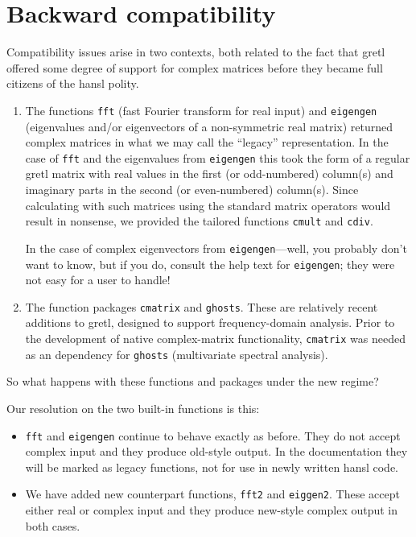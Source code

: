\documentclass{article}
\begin{document}
\section{Backward compatibility}
\label{sec:compat}

Compatibility issues arise in two contexts, both related to the fact
that gretl offered some degree of support for complex matrices before
they became full citizens of the hansl polity.

\begin{enumerate}
\item The functions \texttt{fft} (fast Fourier transform for real
  input) and \texttt{eigengen} (eigenvalues and/or eigenvectors of a
  non-symmetric real matrix) returned complex matrices in what we may
  call the ``legacy'' representation. In the case of \texttt{fft} and
  the eigenvalues from \texttt{eigengen} this took the form of a
  regular gretl matrix with real values in the first (or odd-numbered)
  column(s) and imaginary parts in the second (or even-numbered)
  column(s). Since calculating with such matrices using the standard
  matrix operators would result in nonsense, we provided the tailored
  functions \texttt{cmult} and \texttt{cdiv}.

  In the case of complex eigenvectors from \texttt{eigengen}---well,
  you probably don't want to know, but if you do, consult the help text
  for \texttt{eigengen}; they were not easy for a user to handle!
\item The function packages \texttt{cmatrix} and
  \texttt{ghosts}. These are relatively recent additions to gretl,
  designed to support frequency-domain analysis. Prior to the
  development of native complex-matrix functionality, \texttt{cmatrix}
  was needed as an dependency for \texttt{ghosts} (multivariate
  spectral analysis).
\end{enumerate}

So what happens with these functions and packages under the new
regime?

Our resolution on the two built-in functions is this:
\begin{itemize}
\item \texttt{fft} and \texttt{eigengen} continue to behave exactly as
  before. They do not accept complex input and they produce old-style
  output. In the documentation they will be marked as legacy
  functions, not for use in newly written hansl code.
\item We have added new counterpart functions, \texttt{fft2} and
  \texttt{eiggen2}. These accept either real or complex input and they
  produce new-style complex output in both cases.
\end{itemize}
\end{document}
